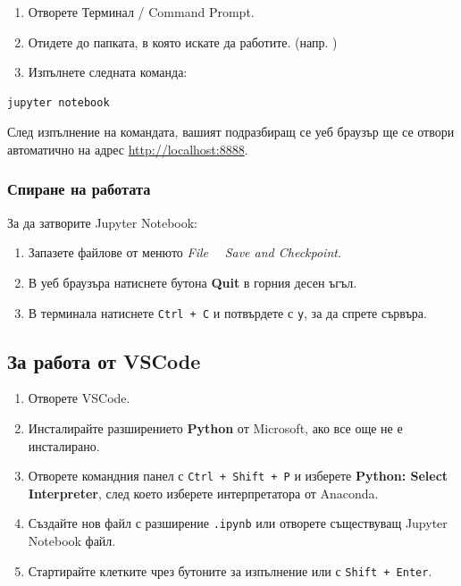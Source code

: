 \documentclass[11pt, a4paper]{article}
\newcommand{\code}[1]{\colorbox{bgcode}{\texttt{\detokenize{#1}}}}
\begin{document}
\begin{enumerate}
    \item Отворете Терминал / Command Prompt.
    \item Отидете до папката, в която искате да работите. (напр. \code{cd ~/Documents})
    \item Изпълнете следната команда:
\end{enumerate}

\begin{lstlisting}
jupyter notebook
\end{lstlisting}

След изпълнение на командата, вашият подразбиращ се уеб браузър ще се отвори автоматично на адрес \url{http://localhost:8888}.

\subsubsection{Спиране на работата}
За да затворите Jupyter Notebook:
\begin{enumerate}
    \item Запазете файлове от менюто \textit{File} \rightarrow \ \ \textit{Save and Checkpoint}.
    \item В уеб браузъра натиснете бутона \textbf{Quit} в горния десен ъгъл.
    \item В терминала натиснете \texttt{Ctrl + C} и потвърдете с \texttt{y}, за да спрете сървъра.
\end{enumerate}

\subsection{За работа от VSCode}
\begin{enumerate}
    \item Отворете VSCode.
    \item Инсталирайте разширението \textbf{Python} от Microsoft, ако все още не е инсталирано.
    \item Отворете командния панел с \texttt{Ctrl + Shift + P} и изберете \textbf{Python: Select Interpreter}, след което изберете интерпретатора от Anaconda.
    \item Създайте нов файл с разширение \texttt{.ipynb} или отворете съществуващ Jupyter Notebook файл.
    \item Стартирайте клетките чрез бутоните за изпълнение или с \texttt{Shift + Enter}.
\end{enumerate}
\end{document}
